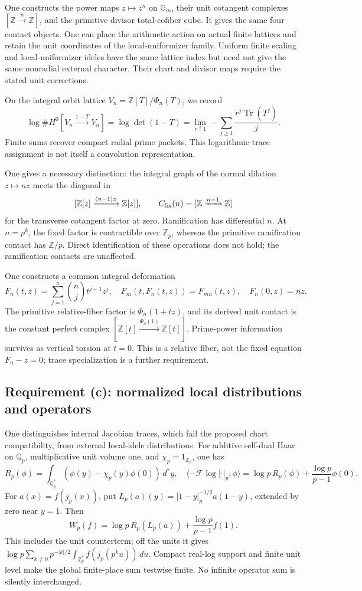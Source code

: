 \documentclass[11pt]{amsart}
\theoremstyle{definition}
\theoremstyle{remark}
\newcommand{\Z}{\mathbb Z}
\newcommand{\Q}{\mathbb Q}
\newcommand{\Tr}{\operatorname{Tr}}
\begin{document}
One constructs the power maps $z\mapsto z^n$ on $\mathbb G_m$,
their unit cotangent complexes $[\Z\xrightarrow n\Z]$, and the primitive
divisor total-cofiber cube. It gives the same four contact objects.
One can place the arithmetic action on actual finite lattices and
retain the unit coordinates of the local-uniformizer family. Uniform
finite scaling and local-uniformizer ideles have the same lattice index
but need not give the same nonradial external character. Their chart and
divisor maps require the stated unit corrections.

On the integral orbit lattice $V_n=\Z[T]/\Phi_n(T)$, we record
\[
 \log\#H^0[V_n\xrightarrow{1-T}V_n]
 =\log\det(1-T)
 =\lim_{r\uparrow1}-\sum_{j\ge1}\frac{r^j\Tr(T^j)}j.
\]
Finite sums recover compact radial prime packets. This logarithmic
trace assignment is not itself a convolution representation.

One gives a necessary distinction: the integral graph of the normal
dilation $z\mapsto nz$ meets the diagonal in
\[
 [\Z[z]\xrightarrow{(n-1)z}\Z[z]],
 \qquad C_{\rm fix}(n)=[\Z\xrightarrow{n-1}\Z]
\]
for the transverse cotangent factor at zero. Ramification has differential
$n$. At $n=p^k$, the fixed factor is contractible over $\Z_p$, whereas
the primitive ramification contact has $\Z/p$. Direct identification of
these operations does not hold; the ramification contacts are unaffected.

One constructs a common integral deformation
\[
 F_n(t,z)=\sum_{j=1}^n\binom nj t^{j-1}z^j,
 \quad F_m(t,F_n(t,z))=F_{mn}(t,z),\quad F_n(0,z)=nz.
\]
The primitive relative-fiber factor is $\Phi_n(1+tz)$, and its derived
unit contact is the constant perfect complex
$[\Z[t]\xrightarrow{\Phi_n(1)}\Z[t]]$. Prime-power information survives
as vertical torsion at $t=0$. This is a relative fiber, not the fixed
equation $F_n-z=0$; trace specialization is a further requirement.

\subsection{Requirement (c): normalized local distributions and operators}
One distinguishes internal Jacobian traces, which fail the proposed
chart compatibility, from external local-idele distributions. For additive
self-dual Haar on $\Q_p$, multiplicative unit volume one, and
$\chi_p=1_{\Z_p}$, one has
\[
 R_p(\phi)=\int_{\Q_p^*}(\phi(y)-\chi_p(y)\phi(0))\,d^*y,
 \quad
 \langle-\mathcal F\log|\cdot|_p,\phi\rangle
 =\log p\,R_p(\phi)+\frac{\log p}{p-1}\phi(0).
\]
For $a(x)=f(j_p(x))$, put
$L_p(a)(y)=|1-y|_p^{-1/2}a(1-y)$, extended by zero near $y=1$.
Then
\[
 W_p(f)=\log p\,R_p(L_p(a))+\frac{\log p}{p-1}f(1).
\]
This includes the unit counterterm; off the units it gives
$\log p\sum_{k\ne0}p^{-|k|/2}\int_{\Z_p^*}f(j_p(p^ku))\,du$.
Compact real-log support and finite unit level make the global finite-place
sum testwise finite. No infinite operator sum is silently interchanged.
\end{document}
